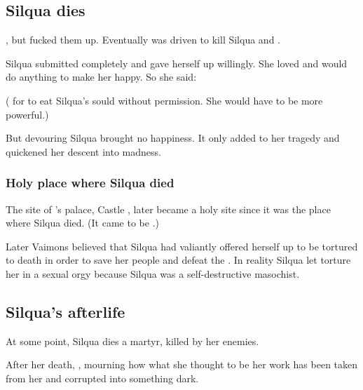 \subsection{Silqua dies}
, but  fucked them up. 
Eventually \Delphine{} was driven to kill Silqua and . 

Silqua submitted completely and gave herself up willingly. 
She loved \Delphine{} and would do anything to make her happy. 
So she said: 

( for \Delphine{} to eat Silqua's sould without permission. She would have to be more powerful.)

But devouring Silqua brought \Delphine{} no happiness. 
It only added to her tragedy and quickened her descent into madness. 





\subsubsection{Holy place where Silqua died}
The site of \Delphine's palace, Castle , later became a holy site since it was the place where Silqua died. 
(It came to be .)

Later Vaimons believed that Silqua had valiantly offered herself up to be tortured to death in order to save her people and defeat the  \Delphine. 
In reality Silqua let \Delphine torture her in a sexual orgy because Silqua was a self-destructive masochist. 









\subsection{Silqua's afterlife}
At some point, Silqua dies a martyr, killed by her enemies.

After her death, , mourning how what she thought to be her work has been taken from her and corrupted into something dark.

